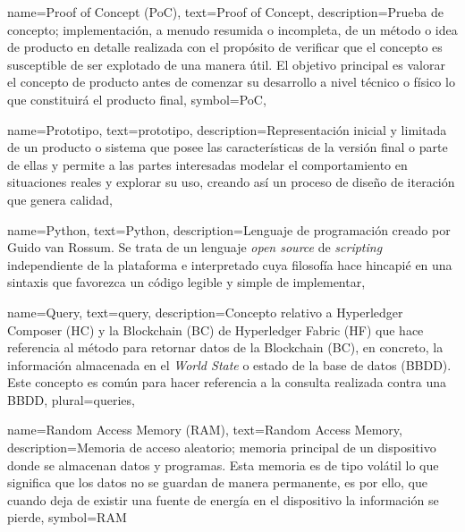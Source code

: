 {
    name={Proof of Concept (PoC)},
    text={Proof of Concept},
    description={Prueba de concepto; implementación, a menudo resumida o incompleta, de un método o idea de producto en detalle realizada con el propósito de verificar que el concepto es susceptible de ser explotado de una manera útil. El objetivo principal es valorar el concepto de producto antes de comenzar su desarrollo a nivel técnico o físico lo que constituirá el producto final},
    symbol={PoC},
}
	
{
    name={Prototipo},
    text={prototipo},
    description={Representación inicial y limitada de un producto o sistema que posee las características de la versión final o parte de ellas y permite a las partes interesadas modelar el comportamiento en situaciones reales y explorar su uso, creando así un proceso de diseño de iteración que genera calidad},
}

{
    name={Python},
    text={Python},
    description={Lenguaje de programación creado por Guido van Rossum. Se trata de un lenguaje \textit{open source} de \textit{scripting} independiente de la plataforma e interpretado cuya filosofía hace hincapié en una sintaxis que favorezca un código legible y simple de implementar},
}

{
    name={Query},
    text={query},
    description={Concepto relativo a Hyperledger Composer (HC) y la Blockchain (BC) de Hyperledger Fabric (HF) que hace referencia al método para retornar datos de la Blockchain (BC), en concreto, la información almacenada en el \textit{World State} o estado de la base de datos (BBDD). Este concepto es común para hacer referencia a la consulta realizada contra una BBDD},
    plural={queries},
}

{
    name={Random Access Memory (RAM)},
    text={Random Access Memory},
    description={Memoria de acceso aleatorio; memoria principal de un dispositivo donde se almacenan datos y programas. Esta memoria es de tipo volátil lo que significa que los datos no se guardan de manera permanente, es por ello, que cuando deja de existir una fuente de energía en el dispositivo la información se pierde},
    symbol={RAM}
}

